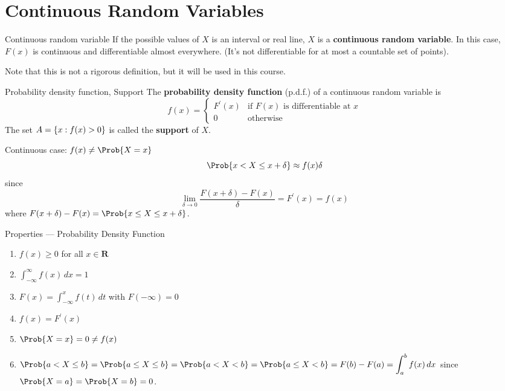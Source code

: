 \section{Continuous Random Variables}
\begin{Definition}{Continuous random variable}{}
    If the possible values of $ X $ is an interval or real line,
    $ X $ is a \textbf{continuous random variable}. In this case,
    $ F(x) $ is continuous and differentiable
    almost everywhere. (It's not differentiable for at
    most a countable set of points).
\end{Definition}
Note that this is not a rigorous definition, but it will be
used in this course.

\begin{Definition}{Probability density function, Support}{}
    The \textbf{probability density function} (p.d.f.) of a continuous random variable
    is
    \[ f(x)=\begin{cases}
            F^\prime(x) & \text{if }F(x)\text{ is differentiable at }x \\
            0           & \text{otherwise}
        \end{cases} \]
    The set $ A=\{x:f(x)>0\} $ is called the \textbf{support}
    of $ X $.
\end{Definition}

Continuous case: $ f(x)\neq \Prob{X=x} $
\[ \Prob{x<X\le x+\delta}\approx f(x)\delta \]
since
\[ \lim\limits_{{\delta} \to {0}}\frac{F(x+\delta)-F(x)}{\delta}=F^\prime(x)=f(x) \]
where $ F(x+\delta)-F(x)=\Prob{x\le X\le x+\delta} $.
\begin{Definition}{Properties --- Probability Density Function}{}
    \begin{enumerate}[label=(\Roman*)]
        \item $ f(x)\ge 0 $ for all $ x\in\mathbf{R} $
        \item $ \displaystyle \int_{-\infty}^{\infty} f(x)\, d{x}= 1 $
        \item $ \displaystyle F(x)=\int_{-\infty}^{x} f(t)\, d{t} $
              with $ F(-\infty)=0 $
        \item $ f(x)=F^\prime(x) $
        \item $ \Prob{X=x}=0\ne f(x) $
        \item $ \displaystyle
                  \Prob{a<X\le b}=\Prob{a\le X\le b}=\Prob{a<X<b}=\Prob{a\le X <b}=
                  F(b)-F(a)=\int_{a}^{b} f(x)\, d{x} $
              since $ \Prob{X=a}=\Prob{X=b}=0 $.
    \end{enumerate}
\end{Definition}

